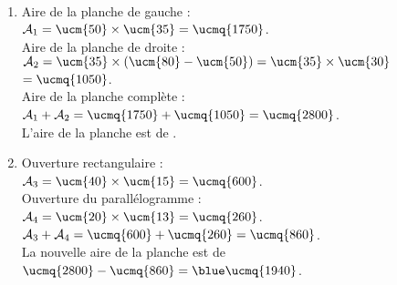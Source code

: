    \ \\ [-5mm]
   \begin{enumerate}
      \item Aire de la planche de gauche : \\
      $\mathcal{A}_1 =\ucm{50}\times\ucm{35} =\ucmq{1750}$. \\
         Aire de la planche de droite : \\
         $\mathcal{A}_2 =\ucm{35}\times(\ucm{80}-\ucm{50}) =\ucm{35}\times\ucm{30}$ \\
         $=\ucmq{1050}$. \\
         Aire de la planche complète : \\
         $\mathcal{A}_1+\mathcal{A}_2 =\ucmq{1750}+\ucmq{1050} =\ucmq{2800}$. \\
         L'aire de la planche est de {\blue {}}.
      \item Ouverture rectangulaire : \\
         $\mathcal{A}_3 =\ucm{40}\times\ucm{15} =\ucmq{600}$. \\
         Ouverture du parallélogramme : \\
         $\mathcal{A}_4 =\ucm{20}\times\ucm{13} =\ucmq{260}$. \\
         $\mathcal{A}_3+\mathcal{A}_4 =\ucmq{600}+\ucmq{260} =\ucmq{860}$. \\
         La nouvelle aire de la planche est de \\
         $\ucmq{2800}-\ucmq{860} ={\blue \ucmq{1940}}$.
   \end{enumerate}
